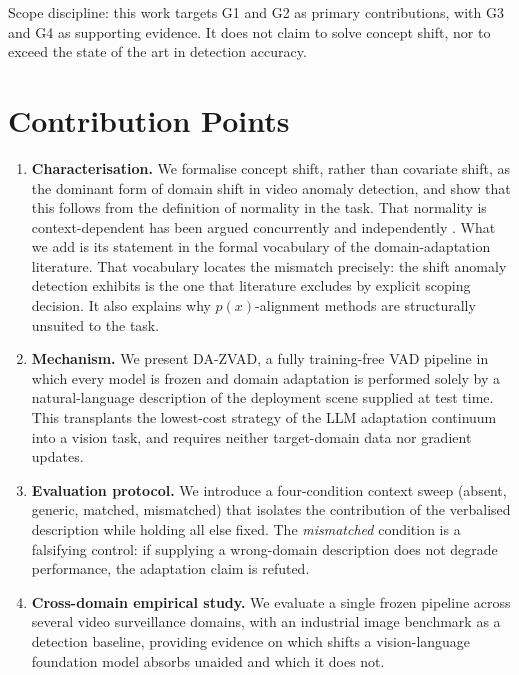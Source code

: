 \documentclass[a4paper,fleqn]{cas-sc}
\newcommand{\wnote}[1]{{\color{notecol}#1}}
\begin{document}
\wnote{Scope discipline: this work targets G1 and G2 as primary contributions,
with G3 and G4 as supporting evidence. It does not claim to solve concept shift,
nor to exceed the state of the art in detection accuracy.}

\section{Contribution Points}
\label{sec:contrib}

\begin{enumerate}[C1.]
  \item \textbf{Characterisation.} We formalise concept shift, rather than
        covariate shift, as the dominant form of domain shift in video anomaly
        detection, and show that this follows from the definition of normality in
        the task. That normality is context-dependent has been argued
        concurrently and independently \citep{wilkinghoff2026context}. What we
        add is its statement in the formal vocabulary of the domain-adaptation
        literature. That vocabulary locates the mismatch precisely: the shift
        anomaly detection exhibits is the one that literature excludes by
        explicit scoping decision. It also explains why $p(x)$-alignment methods
        are structurally unsuited to the task.

  \item \textbf{Mechanism.} We present DA-ZVAD, a fully training-free VAD
        pipeline in which every model is frozen and domain adaptation is
        performed solely by a natural-language description of the deployment
        scene supplied at test time. This transplants the lowest-cost strategy of
        the LLM adaptation continuum \citep{fan2026llm} into a vision task, and
        requires neither target-domain data nor gradient updates.

  \item \textbf{Evaluation protocol.} We introduce a four-condition context sweep
        (absent, generic, matched, mismatched) that isolates the contribution of
        the verbalised description while holding all else fixed. The
        \emph{mismatched} condition is a falsifying control: if supplying a
        wrong-domain description does not degrade performance, the adaptation
        claim is refuted.

  \item \textbf{Cross-domain empirical study.} We evaluate a single frozen
        pipeline across several video surveillance domains, with an industrial
        image benchmark as a detection baseline, providing evidence on which
        shifts a vision-language foundation model absorbs unaided and which it
        does not.


\end{enumerate}
\end{document}
